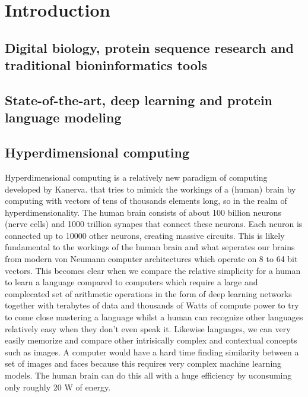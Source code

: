 \chapter[Introduction]%
{Introduction}

\section{Digital biology, protein sequence research and traditional bioninformatics tools}

\section{State-of-the-art, deep learning and protein language modeling}

\section{Hyperdimensional computing}
Hyperdimensional computing is a relatively new paradigm of computing developed by Kanerva.\cite{Kanerva2009} that tries to mimick the workings of a (human) brain by computing with vectors of tens of thousands elements long, so in the realm of hyperdimensionality. The human brain consists of about 100 billion neurons (nerve cells) and 1000 trillion synapes that connect these neurons. Each neuron is connected up to 10000 other neurons, creating massive circuits. This is likely fundamental to the workings of the human brain and what seperates our brains from modern  von Neumann computer architectures which operate on 8 to 64 bit vectors. This becomes clear when we compare the relative simplicity for a human to learn a language compared to computers which require a large and complecated set of arithmetic operations in the form of deep learning networks together with terabytes of data and thousands of Watts of compute power to try to come close mastering a language whilst a human can recognize other languages relatively easy when they don't even speak it. Likewise languages, we can very easily memorize and compare other intrisically complex and contextual concepts such as images. A computer would have a hard time finding similarity between a set of images and faces because this requires very complex machine learning models. The human brain can do this all with a huge efficiency by uconsuming only roughly 20 W of energy.

